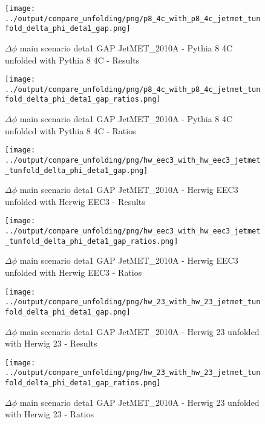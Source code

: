 \documentclass[11pt]{book}
\begin{document}
\begin{figure}[ht]
\centering
\texttt{[image: ../output/compare\_unfolding/png/p8\_4c\_with\_p8\_4c\_jetmet\_tunfold\_delta\_phi\_deta1\_gap.png]}
\caption{$\Delta\phi$ main scenario deta1 GAP JetMET\_2010A - Pythia 8 4C unfolded with Pythia 8 4C - Results}
\label{p8_p8_jetmet_tunfold_delta_phi_deta1_gap_a}
\end{figure}

\begin{figure}[ht]
\centering
\texttt{[image: ../output/compare\_unfolding/png/p8\_4c\_with\_p8\_4c\_jetmet\_tunfold\_delta\_phi\_deta1\_gap\_ratios.png]}
\caption{$\Delta\phi$ main scenario deta1 GAP JetMET\_2010A - Pythia 8 4C unfolded with Pythia 8 4C - Ratios}
\label{p8_p8_jetmet_tunfold_delta_phi_deta1_gap_b}
\end{figure}

\begin{figure}[ht]
\centering
\texttt{[image: ../output/compare\_unfolding/png/hw\_eec3\_with\_hw\_eec3\_jetmet\_tunfold\_delta\_phi\_deta1\_gap.png]}
\caption{$\Delta\phi$ main scenario deta1 GAP JetMET\_2010A - Herwig EEC3 unfolded with Herwig EEC3 - Results}
\label{hw_eec3_hw_eec3_jetmet_tunfold_delta_phi_deta1_gap_a}
\end{figure}

\begin{figure}[ht]
\centering
\texttt{[image: ../output/compare\_unfolding/png/hw\_eec3\_with\_hw\_eec3\_jetmet\_tunfold\_delta\_phi\_deta1\_gap\_ratios.png]}
\caption{$\Delta\phi$ main scenario deta1 GAP JetMET\_2010A - Herwig EEC3 unfolded with Herwig EEC3 - Ratios}
\label{hw_eec3_hw_eec3_jetmet_tunfold_delta_phi_deta1_gap_b}
\end{figure}

\begin{figure}[ht]
\centering
\texttt{[image: ../output/compare\_unfolding/png/hw\_23\_with\_hw\_23\_jetmet\_tunfold\_delta\_phi\_deta1\_gap.png]}
\caption{$\Delta\phi$ main scenario deta1 GAP JetMET\_2010A - Herwig 23 unfolded with Herwig 23 - Results}
\label{hw_23_hw_23_jetmet_tunfold_delta_phi_deta1_gap_a}
\end{figure}

\begin{figure}[ht]
\centering
\texttt{[image: ../output/compare\_unfolding/png/hw\_23\_with\_hw\_23\_jetmet\_tunfold\_delta\_phi\_deta1\_gap\_ratios.png]}
\caption{$\Delta\phi$ main scenario deta1 GAP JetMET\_2010A - Herwig 23 unfolded with Herwig 23 - Ratios}
\label{hw_23_hw_23_jetmet_tunfold_delta_phi_deta1_gap_b}
\end{figure}
\end{document}
